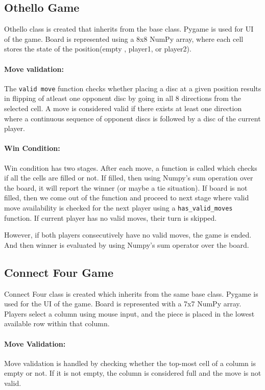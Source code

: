 \documentclass[12pt,a4paper]{article}
\begin{document}
\subsection{Othello Game}
Othello class is created that inherits from the base class. Pygame is used for UI of the game. Board is represented using a 8x8 NumPy array, where each cell stores the state of the position(empty , player1, or player2).
\paragraph{Move validation:}
The \texttt{valid move} function checks whether placing a disc at a given position results in flipping of atleast one opponent disc by going in all 8 directions from the selected cell. A move is considered valid if there exists at least one direction where a continuous sequence of opponent discs is followed by a disc of the current player.

\paragraph{Win Condition:}
Win condition has two stages. After each move, a function is called which checks if all the cells are filled or not. If filled, then using Numpy's sum operation over the board, it will report the winner (or maybe a tie situation). If board is not filled, then we come out of the function and proceed to next stage where valid move availability is checked for the next player using a \texttt{has\_valid\_moves} function. If current player has no valid moves, their turn is skipped.

However, if both players consecutively have no valid moves, the game is ended. And then winner is evaluated by using Numpy's sum operator over the board.

\subsection{Connect Four Game}
Connect Four class is created which inherits from the same base class. Pygame is used for the UI of the game. Board is represented with a 7x7 NumPy array. Players select a column using mouse input, and the piece is placed in the lowest available row within that column.
\paragraph{Move Validation:}
Move validation is handled by checking whether the top-most cell of a column is empty or not. If it is not empty, the column is considered full and the move is not valid.
\end{document}
